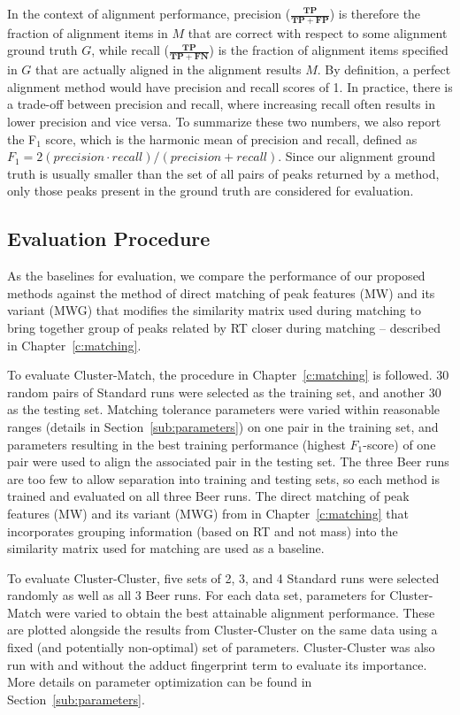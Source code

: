 In the context of alignment performance, precision ($\frac{\boldsymbol{TP}}{\boldsymbol{TP}+\boldsymbol{FP}}$) is therefore the fraction of alignment items in $M$ that are correct with respect to some alignment ground truth $G$, while recall ($\frac{\boldsymbol{TP}}{\boldsymbol{TP}+\boldsymbol{FN}}$) is the fraction of alignment items specified in $G$ that are actually aligned in the alignment results $M$. By definition, a perfect alignment method would have precision and recall scores of 1. In practice, there is a trade-off between precision and recall, where increasing recall often results in lower precision and vice versa. To summarize these two numbers, we also report the F$_1$ score, which is the harmonic mean of precision and recall, defined as $F_1 = 2(precision\cdot recall)/(precision + recall)$. Since our alignment ground truth is usually smaller than the set of all pairs of peaks returned by a method, only those peaks present in the ground truth are considered for evaluation. 

\subsection{Evaluation Procedure\label{sub:evaluation_procedure}}

As the baselines for evaluation, we compare the performance of our proposed methods against the method of direct matching of peak features (MW) and its variant (MWG) that modifies the similarity matrix used during matching to bring together group of peaks related by RT closer during matching -- described in Chapter~\ref{c:matching}. 

To evaluate Cluster-Match, the procedure in Chapter~\ref{c:matching} is followed. 30 random pairs of Standard runs were selected as the training set, and another 30 as the testing set. Matching tolerance parameters were varied within reasonable ranges (details in Section~\ref{sub:parameters}) on one pair in the training set, and parameters resulting in the best training performance (highest $F_1$-score) of one pair were used to align the associated pair in the testing set. The three Beer runs are too few to allow separation into training and testing sets, so each method is trained and evaluated on all three Beer runs. The direct matching of peak features (MW) and its variant (MWG) from in Chapter~\ref{c:matching} that incorporates grouping information (based on RT and not mass) into the similarity matrix used for matching are used as a baseline. 

To evaluate Cluster-Cluster, five sets of 2, 3, and 4 Standard runs were selected randomly as well as all 3 Beer runs. For each data set, parameters for Cluster-Match were varied to obtain the best attainable alignment performance. These are plotted alongside the results from Cluster-Cluster on the same data using a fixed (and potentially non-optimal) set of parameters. Cluster-Cluster was also run with and without the adduct fingerprint term to evaluate its importance. More details on parameter optimization can be found in Section~\ref{sub:parameters}.

